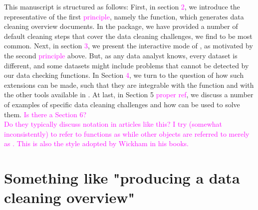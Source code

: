\documentclass[article]{jss}
\newcommand{\hl}[1]{\textcolor{magenta}{#1}}
\newcommand{\R}[1]{\code{#1}}
\begin{document}
This manuscript is structured as follows: First, in section \hl{2}, we introduce the representative of the first \hl{principle}, namely the \R{clean()} function, which generates data cleaning overview documents. In the  package, we have provided a number of default cleaning steps that cover the data cleaning challenges, we find to be most common. Next, in section \hl{3}, we present the interactive mode of , as motivated by the second \hl{principle} above. But, as any data analyst knows, every dataset is different, and some datasets might include problems that cannot be detected by our data checking functions. In Section \hl{4}, we turn to the question of how such  extensions can be made, such that they are integrable with the \R{clean()} function and with the other tools available in .  At last, in Section 5 \hl{proper ref}, we discuss a number of examples of specific data cleaning challenges and how  can be used to solve them. \hl{Is there a Section 6?}\\

\hl{Do they typically discuss notation in articles like this? I try (somewhat inconsistently) to refer to functions as \R{function()} while other \R{R} objects are referred to merely as \R{object}. This is also the style adopted by Wickham in his books.}
 



\section{Something like "producing a data cleaning overview"} \label{sec:example1}
\end{document}
